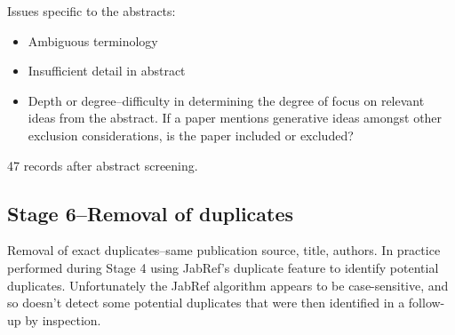 Issues specific to the abstracts:
\begin{itemize}
	\item Ambiguous terminology
	\item Insufficient detail in abstract
	\item Depth or degree--difficulty in determining the degree of focus on relevant ideas from the abstract. If a paper mentions generative ideas amongst other exclusion considerations, is the paper included or excluded? 
\end{itemize}

47 records after abstract screening.

\subsection{Stage 6--Removal of duplicates}

Removal of exact duplicates--same publication source, title, authors. In practice performed during Stage 4 using JabRef's duplicate feature to identify potential duplicates. Unfortunately the JabRef algorithm appears to be case-sensitive, and so doesn't detect some potential duplicates that were then identified in a follow-up by inspection.

